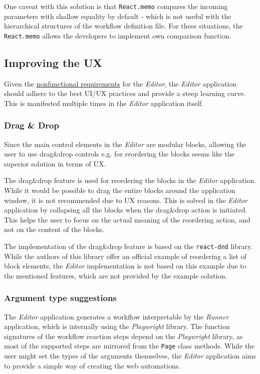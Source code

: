 One caveat with this solution is that \texttt{React.memo} compares the incoming parameters with shallow equality by default - which is not useful with the hierarchical structures of the workflow definition file.
For these situations, the \texttt{React.memo} allows the developers to implement own comparison function.

\subsection{Improving the \acs{UX}}
Given the \hyperref[requirements]{nonfunctional requirements} for the \textit{Editor}, the \textit{Editor} application should adhere to the best \ac{UI}/\ac{UX} practices and provide a steep learning curve.
This is manifested multiple times in the \textit{Editor} application itself.


\subsubsection{Drag \& Drop}
Since the main control elements in the \textit{Editor} are modular blocks, allowing the user to use drag\&drop controls e.g. for reordering the blocks seems like the superior solution in terms of UX.

The drag\&drop feature is used for reordering the blocks in the \textit{Editor} application.
While it would be possible to drag the entire blocks around the application window, it is not recommended due to UX reasons.
This is solved in the \textit{Editor} application by collapsing all the blocks when the drag\&drop action is initiated.
This helps the user to focus on the actual meaning of the reordering action, and not on the content of the blocks.

The implementation of the drag\&drop feature is based on the \texttt{react-dnd} library.
While the authors of this library offer an official example of reordering a list of block elements, the \textit{Editor} implementation is not based on this example due to the mentioned features,
which are not provided by the example solution.

\subsubsection{Argument type suggestions}
The \textit{Editor} application generates a workflow interpretable by the \textit{Runner} application, which is internally using the \textit{Playwright} library.
The function signatures of the workflow reaction steps depend on the \textit{Playwright} library, as most of the supported steps are mirrored from the \texttt{Page} class methods.
While the user might set the types of the arguments themselves, the \textit{Editor} application aims to provide a simple way of creating the web automations.

